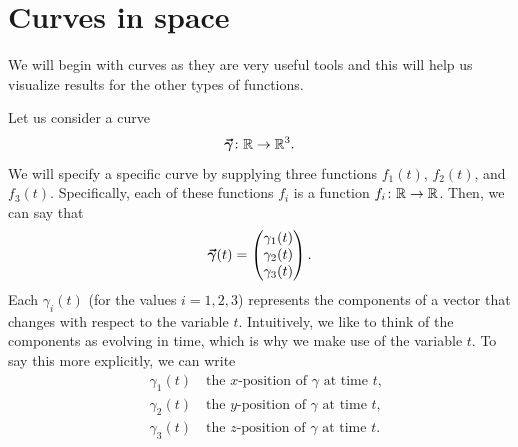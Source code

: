         
        \section{Curves in space}
        
        We will begin with curves as they are very useful tools and this will help us visualize results for the other types of functions. 
        
        Let us consider a curve
        \[
        \boldsymbol{\vec{\gamma}} \colon \mathbb{R} \to \mathbb{R}^3.
        \]
        We will specify a specific curve by supplying three functions $f_1(t)$, $f_2(t)$, and $f_3(t)$. Specifically, each of these functions $f_i$ is a function $f_i\colon \mathbb{R} \to \mathbb{R}$. Then, we can say that
        \[
        \boldsymbol{\vec{\gamma}}(t)=\begin{pmatrix} \gamma_1(t)\\ \gamma_2(t)\\ \gamma_3(t)\end{pmatrix}.
        \]
       Each $\gamma_i(t)$ (for the values $i=1,2,3$) represents the components of a vector that changes with respect to the variable $t$. Intuitively, we like to think of the components as evolving in time, which is why we make use of the variable $t$. To say this more explicitly, we can write
        \begin{align*}
            &\gamma_1(t) \quad \textrm{the $x$-position of $\gamma$ at time $t$,}\\
            &\gamma_2(t) \quad \textrm{the $y$-position of $\gamma$ at time $t$,}\\
            &\gamma_3(t) \quad \textrm{the $z$-position of $\gamma$ at time $t$.}
        \end{align*}
        
